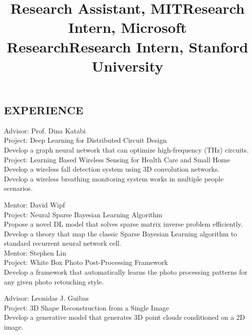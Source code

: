 \documentclass[margin]{res}
\newcommand{\Bullet}[1]{{\raisebox{0.25ex}{\tiny$\bullet$\ }}{#1}\\}
\begin{document}
\begin{resume}
\section{EXPERIENCE}
\title{\textbf{Research Assistant, MIT}}
\begin{position}
    Advisor: Prof. Dina Katabi \\
    Project: Deep Learning for Distributed Circuit Design \\
    \Bullet{Develop a graph neural network that can optimize high-frequency (THz) circuits.}

    \vspace{-7mm}
    Project: Learning Based Wireless Sensing for Health Care and Small Home \\
    \Bullet{Develop a wireless fall detection system using 3D convolution networks.}
    \Bullet{Develop a wireless breathing monitoring system works in multiple people scenarios.}
\end{position}
\vspace{-5mm}

\title{\textbf{Research Intern, Microsoft Research}}
\begin{position}
    Mentor: David Wipf \\
    Project: Neural Sparse Bayesian Learning Algorithm \\
    \Bullet{Propose a novel DL model that solves sparse matrix inverse problem efficiently.}
    \Bullet{Develop a theory that map the classic Sparse Bayesian Learning algorithm to standard recurrent neural network cell.}

    \vspace{-7mm}
    Mentor: Stephen Lin \\
    Project: White Box Photo Post-Processing Framework \\
    \Bullet{Develop a framework that automatically learns the photo processing patterns for any given photo retouching style.}
\end{position}
\vspace{-5mm}

\title{\textbf{Research Intern, Stanford University}}
\begin{position}
    Advisor: Leonidas J. Guibas \\
    Project: 3D Shape Reconstruction from a Single Image \\
    \Bullet{Develop a generative model that generates 3D point clouds conditioned on a 2D image.}
\end{position}
\vspace{-5mm}


\end{resume}
\end{document}
